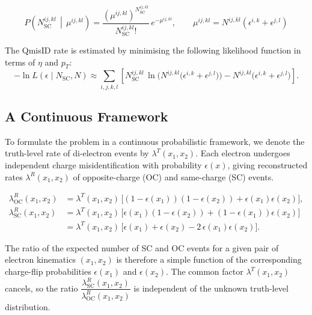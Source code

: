 \begin{equation}
P\!\left(
N_{\mathrm{SC}}^{ij,kl}
\,\middle|\,
\mu^{ij,kl}
\right)
=
\frac{
\left(\mu^{ij,kl}\right)^{N_{\mathrm{SC}}^{ij,kl}}
}{
N_{\mathrm{SC}}^{ij,kl}!
}
\,e^{-\mu^{ij,kl}},
\qquad
\mu^{ij,kl}
=
N^{ij,kl}
\left(
\epsilon^{i,k}
+
\epsilon^{j,l}
\right)
\end{equation}

The QmisID rate is estimated by minimising the following likelihood function in terms of \(\eta\) and \(p_T\):
\begin{equation}
-\ln L\!\left(\epsilon\mid N_{\mathrm{SC}},N\right)
\approx
\sum_{i,j,k,l}
\left[
N_{\mathrm{SC}}^{ij,kl}\,
\ln\!\Big(N^{ij,kl}\big(\epsilon^{i,k}+\epsilon^{j,l}\big)\Big)
-
N^{ij,kl}\big(\epsilon^{i,k}+\epsilon^{j,l}\big)
\right].
\end{equation}


\subsection{A Continuous Framework}
To formulate the problem in a continuous probabilistic framework, we denote the truth-level rate of di-electron events by \(\lambda^{T}(x_1,x_2)\). Each electron undergoes independent charge misidentification with probability \(\epsilon(x)\), giving reconstructed rates \(\lambda^{R}(x_1,x_2)\) of opposite-charge (OC) and same-charge (SC) events.

\begin{equation}
\begin{aligned}
    \lambda_{\mathrm{OC}}^{R}(x_1,x_2)
    &= \lambda^{T}(x_1,x_2)\,
       \Big[(1-\epsilon(x_1))(1-\epsilon(x_2))
       + \epsilon(x_1)\epsilon(x_2)\Big], \\[6pt]
    \lambda_{\mathrm{SC}}^{R}(x_1,x_2)
    &= \lambda^{T}(x_1,x_2)\,
       \Big[\epsilon(x_1)(1-\epsilon(x_2))
       + (1-\epsilon(x_1))\epsilon(x_2)\Big] \\[4pt]
    &= \lambda^{T}(x_1,x_2)\,
       \Big[\epsilon(x_1) + \epsilon(x_2)
       - 2\,\epsilon(x_1)\epsilon(x_2)\Big].
\end{aligned}
\end{equation}

The ratio of the expected number of SC and OC events for a given pair of electron kinematics \((x_1,x_2)\) is therefore a simple function of the corresponding charge-flip probabilities \(\epsilon(x_1)\) and \(\epsilon(x_2)\). The common factor \(\lambda^{T}(x_1,x_2)\) cancels, so the ratio \(\dfrac{\lambda_{\mathrm{SC}}^{R}(x_1,x_2)}{\lambda_{\mathrm{OC}}^{R}(x_1,x_2)}\) is independent of the unknown truth-level distribution.

